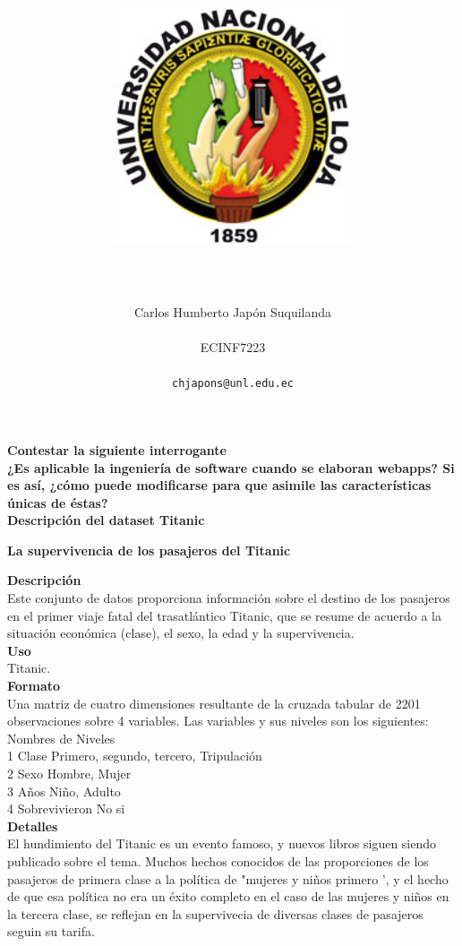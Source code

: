 \documentclass[12pt]{report}
\title{\includegraphics[width=7cm, height=7cm]{unl.jpg}}
\author{\\\\ Carlos Humberto Japón Suquilanda \\\\ ECINF7223 \\\\ \texttt{chjapons@unl.edu.ec}}
\begin{document}
\maketitle

\textbf{Contestar la siguiente interrogante}\\

\textbf{¿Es aplicable la ingeniería de software cuando se elaboran webapps? Si es así, ¿cómo puede modificarse para que asimile las características únicas de éstas?}\\

\textbf{Descripción del dataset Titanic}\\
\begin{center}

\textbf{La supervivencia de los pasajeros del Titanic}\end{center}

\textbf{Descripción}\\

Este conjunto de datos proporciona información sobre el destino de los pasajeros en el primer viaje fatal del trasatlántico Titanic, que se resume de acuerdo a la situación económica (clase), el sexo, la edad y la supervivencia.\\

\textbf{Uso}\\

Titanic.\\

\textbf{Formato}\\

Una matriz de cuatro dimensiones resultante de la cruzada tabular de 2201 observaciones sobre 4 variables. Las variables y sus niveles son los siguientes:\\

Nombres de	Niveles\\
1	Clase	Primero, segundo, tercero, Tripulación\\
2	Sexo	Hombre, Mujer\\
3	Años	Niño, Adulto\\
4	Sobrevivieron	No si\\

\textbf{Detalles}\\

El hundimiento del Titanic es un evento famoso, y nuevos libros siguen siendo publicado sobre el tema. Muchos hechos conocidos de las proporciones de los pasajeros de primera clase a la política de "mujeres y niños primero ', y el hecho de que esa política no era un éxito completo en el caso de las mujeres y niños en la tercera clase, se reflejan en la supervivecia de diversas clases de pasajeros seguin su tarifa.\\
\end{document}
